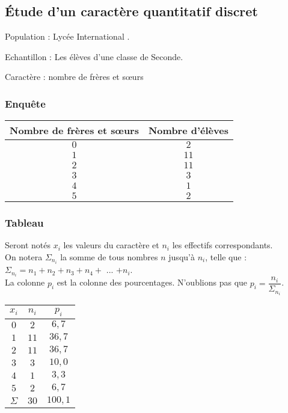\newpage

\subsection{Étude d'un caractère quantitatif discret}

Population : Lycée International .

Echantillon : Les élèves d'une classe de Seconde.

Caractère : nombre de frères et sœurs

\subsubsection{Enquête}

\begin{tabular}{c|c}
Nombre de frères et sœurs & Nombre d'élèves \\
\hline
$0$ & $2$ \\
$1$ & $11$ \\
$2$ & $11$ \\
$3$ & $3$ \\
$4$ & $1$ \\
$5$ & $2$ \\
\end{tabular}

\subsubsection{Tableau}

Seront notés $x_i$ les valeurs du caractère et $n_i$ les effectifs correspondants.  \\

On notera $\Sigma_{n_i}$ la somme de tous nombres $n$ jusqu'à $n_i$, telle que : $\Sigma_{n_i} = n_1 + n_2 + n_3 + n_4 +$ ... $ + n_i $. \\

La colonne $p_i$ est la colonne des pourcentages. N'oublions pas que $p_i = \dfrac{n_i}{\Sigma_{n_i}}$. 

\begin{tabular}{c|c|c}
$x_i$ & $n_i$ & $p_i$ \\
\hline
$0$ & $2$ & $6,7$ \\
$1$ & $11$ & $36,7$ \\
$2$ & $11$ & $36,7$ \\
$3$ & $3$ & $10,0$ \\
$4$ & $1$ & $3,3 $\\
$5$ & $2$ & $6,7 $ \\
\hline
$\Sigma$ & $30$ & $100,1$ \\ 
\end{tabular} 

